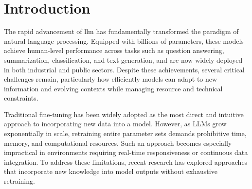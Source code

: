 \documentclass[a4paper,fleqn]{cas-sc}
\begin{document}
\maketitle

\section{Introduction}

The rapid advancement of \gls{llm} has fundamentally transformed the paradigm of natural language processing.
Equipped with billions of parameters, these models achieve human-level performance across tasks such as question answering, summarization, classification, and text generation, and are now widely deployed in both industrial and public sectors.
Despite these achievements, several critical challenges remain, particularly how efficiently models can adapt to new information and evolving contexts while managing resource and technical constraints.

Traditional fine-tuning has been widely adopted as the most direct and intuitive approach to incorporating new data into a model.
However, as LLMs grow exponentially in scale, retraining entire parameter sets demands prohibitive time, memory, and computational resources.
Such an approach becomes especially impractical in environments requiring real-time responsiveness or continuous data integration.
To address these limitations, recent research has explored approaches that incorporate new knowledge into model outputs without exhaustive retraining.
\end{document}
